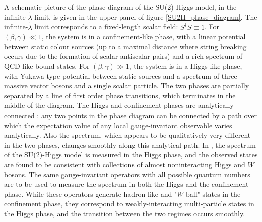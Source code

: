 A schematic picture of the phase diagram of the SU(2)-Higgs model, in the infinite-$\tilde \lambda$ limit, is given in the upper panel of figure \ref{SU2H_phase_diagram}. The infinite-$\tilde \lambda$ limit corresponds to a fixed-length scalar field: $S^{\dagger} S \equiv 1$. For $(\beta,\gamma) \ll 1$, the system is in a confinement-like phase, with a linear potential between static colour sources (up to a maximal distance where string breaking occurs due to the formation of scalar-antiscalar pairs) and a rich spectrum of QCD-like bound states. For $(\beta,\gamma) \gg 1$, the system is in a Higgs-like phase, with Yukawa-type potential between static sources and a spectrum of three massive vector bosons and a single scalar particle. The two phases are partially separated by a line of first order phase transitions, which terminates in the middle of the diagram. The Higgs and confinement phases are analytically connected \cite{Fradkin:1978dv,OSTERWALDER1978440}: any two points in the phase diagram can be connected by a path over which the expectation value of any local gauge-invariant observable varies analytically. Also the spectrum, which appears to be qualitatively very different in the two phases, changes smoothly along this analytical path. In \cite{Wurtz:2013ova}, the spectrum of the SU(2)-Higgs model is measured in the Higgs phase, and the observed states are found to be consistent with collections of almost noninteracting Higgs and $W$ bosons. The same gauge-invariant operators with all possible quantum numbers are to be used to measure the spectrum in both the Higgs and the confinement phase. While these operators generate hadron-like and "$W$-ball" states in the confinement phase, they correspond to weakly-interacting multi-particle states in the Higgs phase, and the transition between the two regimes occurs smoothly. 

